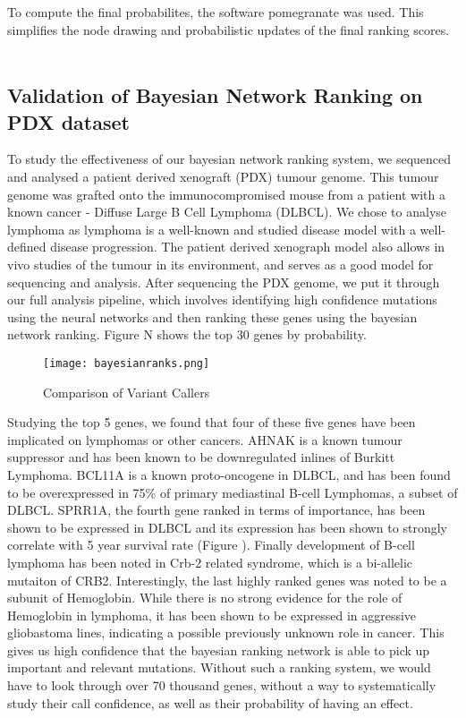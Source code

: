 \documentclass{article}
\begin{document}
\normalsize
\noindent
To compute the final probabilites, the software pomegranate was used. This simplifies the node drawing and probabilistic updates of the final ranking scores. \\\\


\subsection{Validation of Bayesian Network Ranking on PDX dataset}
To study the effectiveness of our bayesian network ranking system, we sequenced and analysed a patient derived xenograft (PDX) tumour genome. This tumour genome was grafted onto the immunocompromised mouse from a patient with a known cancer - Diffuse Large B Cell Lymphoma (DLBCL). We chose to analyse lymphoma as lymphoma is a well-known and studied disease model with a well-defined disease progression. The patient derived xenograph model also allows in vivo studies of the tumour in its environment, and serves as a good model for sequencing and analysis. After sequencing the PDX genome, we put it through our full analysis pipeline, which involves identifying high confidence mutations using the neural networks and then ranking these genes using the bayesian network ranking. Figure N shows the top 30 genes by probability. 

\begin{figure}[H]
\texttt{[image: bayesianranks.png]}
\caption{Comparison of Variant Callers}
\centering
\end{figure}

Studying the top 5 genes, we found that four of these five genes have been implicated on lymphomas or other cancers. AHNAK is a known tumour suppressor and has been known to be downregulated inlines of Burkitt Lymphoma. BCL11A is a known proto-oncogene in DLBCL, and has been found to be overexpressed in 75\% of primary mediastinal B-cell Lymphomas, a subset of DLBCL. SPRR1A, the fourth gene ranked in terms of importance, has been shown to be expressed in DLBCL and its expression has been shown to strongly correlate with 5 year survival rate (Figure ). Finally development of B-cell lymphoma has been noted in Crb-2 related syndrome, which is a bi-allelic mutaiton of CRB2. Interestingly, the last highly ranked genes was noted to be a subunit of Hemoglobin. While there is no strong evidence for the role of Hemoglobin in lymphoma, it has been shown to be expressed in aggressive gliobastoma lines, indicating a possible previously unknown role in cancer. This gives us high confidence that the bayesian ranking network is able to pick up important and relevant mutations. Without such a ranking system, we would have to look through over 70 thousand genes, without a way to systematically study their call confidence, as well as their probability of having an effect. 
\end{document}

